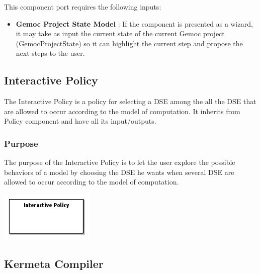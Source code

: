 \documentclass{gemoc} %
\begin{document}
This component port requires the following inputs:
\begin{itemize}
  \item \textbf{Gemoc Project State Model} :
If the component is presented as a wizard, it may take as input the current state of the current Gemoc project (GemocProjectState) so it can highlight the current step and propose the next steps to the user.
\end{itemize}



\subsection{Interactive Policy}
The Interactive Policy is a policy for selecting a DSE among the all the DSE that are allowed to occur according to the model of computation.
It inherits from Policy component and have all its input/outputs.

\subsubsection{Purpose}
The purpose of the Interactive Policy is to let the user explore the possible behaviors of a model by choosing the DSE he wants when several DSE are allowed to occur according to the model of computation.

\begin{center}
\includegraphics*[trim=0.0cm 0.0cm 0cm 0.0cm, clip=true]{../images/generated/Generated_Interactive_Policy.png}
\end{center}




\subsection{Kermeta Compiler}
\end{document}
